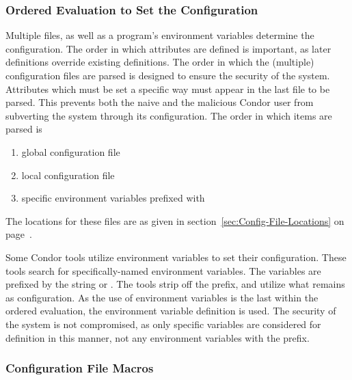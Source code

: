 \subsubsection{\label{sec:Ordering-Config-File}Ordered Evaluation to
Set the Configuration} 

Multiple files, as well as a program's environment variables
determine the configuration.
The order in which attributes are defined is important, as later
definitions override existing definitions.
The order in which the (multiple) configuration files are parsed 
is designed to ensure the security of the system.
Attributes which must be set a specific way 
must appear in the last file to be parsed.
This prevents both the naive and the malicious Condor user 
from subverting the system through its configuration.
The order in which items are parsed is
\begin{enumerate}
\item global configuration file
\item local configuration file
\item specific environment variables prefixed with 
\end{enumerate}

The locations for these files are as given in
section~\ref{sec:Config-File-Locations} on
page~\pageref{sec:Config-File-Locations}.

Some Condor tools utilize environment variables to set their
configuration.
These tools search for specifically-named environment variables.
The variables are prefixed by the string 
or .
The tools strip off the prefix, and utilize what remains
as configuration.
As the use of environment variables is the last within
the ordered evaluation, 
the environment variable definition is used.
The security of the system is not compromised,
as only specific variables are considered for definition
in this manner, not any environment variables with
the  prefix.


\subsubsection{\label{sec:Config-File-Macros}Configuration File Macros} 

